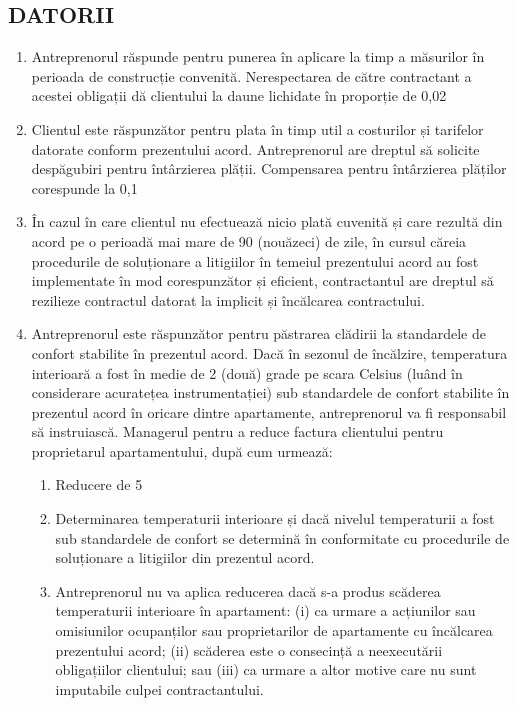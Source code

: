 \begin{multicols}{2}
\subsection{DATORII}
\begin{enumerate}
\item Antreprenorul răspunde pentru punerea în aplicare la timp a măsurilor în perioada de construcție convenită. Nerespectarea de către contractant a acestei obligații dă clientului la daune lichidate în proporție de 0,02%
\item Clientul este răspunzător pentru plata în timp util a costurilor și tarifelor datorate conform prezentului acord. Antreprenorul are dreptul să solicite despăgubiri pentru întârzierea plății. Compensarea pentru întârzierea plăților corespunde la 0,1%
\item În cazul în care clientul nu efectuează nicio plată cuvenită și care rezultă din acord pe o perioadă mai mare de 90 (nouăzeci) de zile, în cursul căreia procedurile de soluționare a litigiilor în temeiul prezentului acord au fost implementate în mod corespunzător și eficient, contractantul are dreptul să rezilieze contractul datorat la implicit și încălcarea contractului.
\item Antreprenorul este răspunzător pentru păstrarea clădirii la standardele de confort stabilite în prezentul acord. Dacă în sezonul de încălzire, temperatura interioară a fost în medie de 2 (două) grade pe scara Celsius (luând în considerare acuratețea instrumentației) sub standardele de confort stabilite în prezentul acord în oricare dintre apartamente, antreprenorul va fi responsabil să instruiască. Managerul pentru a reduce factura clientului pentru proprietarul apartamentului, după cum urmează:
\begin{enumerate}
\item Reducere de 5%
\item Determinarea temperaturii interioare și dacă nivelul temperaturii a fost sub standardele de confort se determină în conformitate cu procedurile de soluționare a litigiilor din prezentul acord.
\item Antreprenorul nu va aplica reducerea dacă s-a produs scăderea temperaturii interioare în apartament: (i) ca urmare a acțiunilor sau omisiunilor ocupanților sau proprietarilor de apartamente cu încălcarea prezentului acord; (ii) scăderea este o consecință a neexecutării obligațiilor clientului; sau (iii) ca urmare a altor motive care nu sunt imputabile culpei contractantului.

\end{enumerate}
\end{enumerate}
\end{multicols}

